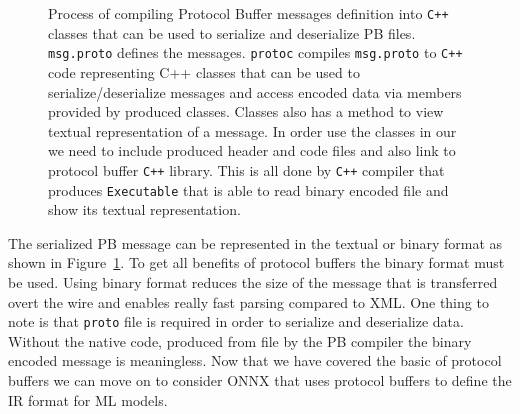 \documentclass[english, 12pt, a4paper, elec, utf8, online]{aaltothesis}
\begin{document}
\begin{figure}[h!]
\caption{Process of compiling Protocol Buffer messages definition into \texttt{C++} classes that can be used to serialize and deserialize PB files. \texttt{msg.proto} defines the messages. \texttt{protoc} compiles \texttt{msg.proto} to \texttt{C++} code representing C++ classes that can be used to serialize/deserialize messages and access encoded data via members provided by produced classes. Classes also has a method to view textual representation of a message. In order use the classes in our  we need to include produced header and code files and also link to protocol buffer \texttt{C++} library. This is all done by \texttt{C++} compiler that produces \texttt{Executable} that is able to read binary encoded  file and show its textual representation.}\label{fig:proto_compile}
\end{figure}

The serialized PB message can be represented in the textual or binary format as shown in Figure~\ref{fig:proto_compile}. To get all benefits of protocol buffers the binary format must be used. Using binary format reduces the size of the message that is transferred overt the wire and enables really fast parsing compared to XML. One thing to note is that \texttt{proto} file is required in order to serialize and deserialize data. Without the native code, produced from  file by the PB compiler the binary encoded message is meaningless.  Now that we have covered the basic of protocol buffers we can move on to consider ONNX that uses protocol buffers to define the IR format for ML models. 
\end{document}

